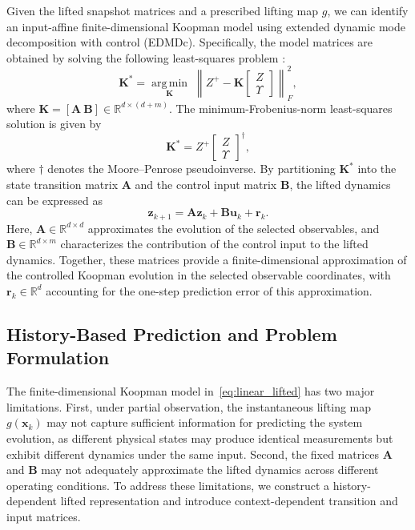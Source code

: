 \documentclass[journal]{IEEEtran}
\newcommand{\vx}{\mathbf{x}}
\newcommand{\vr}{\mathbf{r}}
\newcommand{\vu}{\mathbf{u}}
\newcommand{\vz}{\mathbf{z}}
\newcommand{\mA}{\mathbf{A}}
\newcommand{\mB}{\mathbf{B}}
\newcommand{\mK}{\mathbf{K}}
\newcommand{\R}{\mathbb{R}}
\theoremstyle{plain}
\theoremstyle{definition}
\theoremstyle{definition}
\begin{document}
Given the lifted snapshot matrices and a prescribed lifting map
$g$, we can identify an input-affine finite-dimensional Koopman
model using extended dynamic mode decomposition with control
(EDMDc). Specifically, the model matrices are obtained by solving
the following least-squares problem
\cite{williams2015data,proctor2016dynamic}:
\begin{equation}
\mK^*=\underset{\mK}{\operatorname{arg\,min}}\;
\left\|Z^+-\mK
\begin{bmatrix}Z\\\Upsilon\end{bmatrix}\right\|_F^2,
\label{eq:edmd_control_optimization}
\end{equation}
where $\mK=[\mA\ \mB]\in\R^{d\times(d+m)}$.
The minimum-Frobenius-norm least-squares solution is given by
\begin{equation}
\mK^*=Z^+\begin{bmatrix}Z\\\Upsilon\end{bmatrix}^{\dagger},
\label{eq:edmd_control_solution}
\end{equation}
where $\dagger$ denotes the Moore--Penrose pseudoinverse.
By partitioning $\mK^*$ into the state transition matrix $\mA$
and the control input matrix $\mB$, the lifted dynamics can be
expressed as
\begin{equation}
\vz_{k+1}=\mA\vz_k+\mB\vu_k+\vr_k.
\label{eq:linear_lifted}
\end{equation}
Here, $\mA\in\R^{d\times d}$ approximates the evolution of the
selected observables, and $\mB\in\R^{d\times m}$ characterizes
the contribution of the control input to the lifted dynamics.
Together, these matrices provide a finite-dimensional
approximation of the controlled Koopman evolution in the
selected observable coordinates, with $\vr_k\in\R^d$
accounting for the one-step prediction error of this
approximation.

\subsection{History-Based Prediction and Problem Formulation}
\label{sec:problem}

The finite-dimensional Koopman model in~\eqref{eq:linear_lifted}
has two major limitations. First, under partial observation, the
instantaneous lifting map $g(\vx_k)$ may not capture sufficient
information for predicting the system evolution, as different
physical states may produce identical measurements but exhibit
different dynamics under the same input. Second, the fixed matrices
$\mA$ and $\mB$ may not adequately approximate the lifted dynamics
across different operating conditions. To address these limitations,
we construct a history-dependent lifted representation and introduce
context-dependent transition and input matrices.
\end{document}
